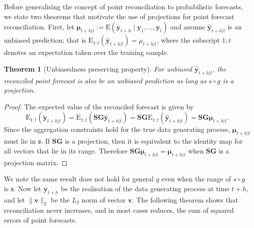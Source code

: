 \documentclass[12pt]{article}
\def\E{\text{E}}
\newtheorem{theo}{Theorem}[section]
\theoremstyle{definition}
\begin{document}
Before generalising the concept of point reconciliation to probabilistic forecasts, we state two theorems that motivate the use of projections for point forecast reconciliation. First, let $\bm{\mu}_{t+h|t}:=\E(\bm{y}_{t+h}\mid\bm{y}_{1},\dots,\bm{y}_{t})$ and assume $\hat{\bm{y}}_{t+h|t}$ is an unbiased prediction; that is $\E_{1:t}(\hat{\bm{y}}_{t+h|t})=\mu_{t+h|t}$, where the subscript $1:t$ denotes an expectation taken over the training sample.

\begin{theo}[Unbiasedness preserving property]
  For unbiased $\hat{\bm{y}}_{t+h|t}$, the reconciled point forecast is also be an unbiased prediction as long as $s\circ g$ is a projection.
\end{theo}
\begin{proof}
	The expected value of the reconciled forecast is given by
	\[
  	\E_{1:t}(\tilde{\bm{y}}_{t+h|t})
	  = \E_{1:t}(\bm{S}\bm{G}\hat{\bm{y}}_{t+h|t})
  	= \bm{S}\bm{G}\E_{1:t}(\hat{\bm{y}}_{t+h|t})
    = \bm{S}\bm{G}\bm{\mu}_{t+h|t}.
	\]
	Since the aggregation constraints hold for the true data generating process, $\bm{\mu}_{t+h|t}$ must lie in $\mathfrak{s}$. If $\bm{S}\bm{G}$ is a projection, then it is equivalent to the identity map for all vectors that lie in its range. Therefore $\bm{S}\bm{G}\bm{\mu}_{t+h|t}=\bm{\mu}_{t+h|t}$ when $\bm{S}\bm{G}$ is a projection matrix.
\end{proof}
We note the same result does not hold for general $g$ even when the range of $s\circ g$ is $\mathfrak{s}$. Now let $\bm{y}_{t+h}$ be the realisation of the data generating process at time $t+h$, and let $\|\bm{v}\|_2$ be the $L_2$ norm of vector $\bm{v}$. The following theorem shows that reconciliation never increases, and in most cases reduces, the sum of squared errors of point forecasts.
\end{document}
